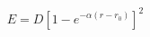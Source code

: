 \documentclass[12pt]{article}
\begin{document}
$$
   E = D \left[ 1 - e^{-\alpha (r - r_0)} \right]^2 
$$
\end{document}

